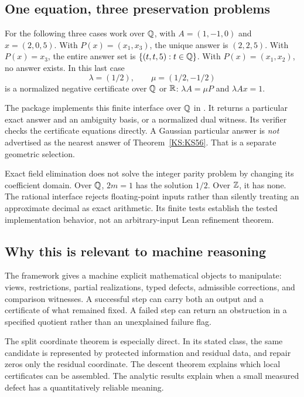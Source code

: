 \subsection{One equation, three preservation problems}
For the following three cases work over \(\mathbb Q\), with \(A=(1,-1,0)\) and \(x=(2,0,5)\). With \(P(x)=(x_1,x_3)\), the unique answer is \((2,2,5)\). With \(P(x)=x_3\), the entire answer set is \(\{(t,t,5):t\in\mathbb Q\}\). With \(P(x)=(x_1,x_2)\), no answer exists. In this last case
\[
 \lambda=(1/2),\qquad\mu=(1/2,-1/2)
\]
is a normalized negative certificate over \(\mathbb Q\) or \(\mathbb R\): \(\lambda A=\mu P\) and \(\lambda Ax=1\).

The package implements this finite interface over \(\mathbb Q\) in . It returns a particular exact answer and an ambiguity basis, or a normalized dual witness. Its verifier checks the certificate equations directly. A Gaussian particular answer is \emph{not} advertised as the nearest answer of Theorem~\ref{KS:KS56}. That is a separate geometric selection.

Exact field elimination does not solve the integer parity problem by changing its coefficient domain. Over \(\mathbb Q\), \(2m=1\) has the solution \(1/2\). Over \(\mathbb Z\), it has none. The rational interface rejects floating-point inputs rather than silently treating an approximate decimal as exact arithmetic. Its finite tests establish the tested implementation behavior, not an arbitrary-input Lean refinement theorem.

\subsection{Why this is relevant to machine reasoning}
The framework gives a machine explicit mathematical objects to manipulate: views, restrictions, partial realizations, typed defects, admissible corrections, and comparison witnesses. A successful step can carry both an output and a certificate of what remained fixed. A failed step can return an obstruction in a specified quotient rather than an unexplained failure flag.

The split coordinate theorem is especially direct. In its stated class, the same candidate is represented by protected information and residual data, and repair zeros only the residual coordinate. The descent theorem explains which local certificates can be assembled. The analytic results explain when a small measured defect has a quantitatively reliable meaning.


